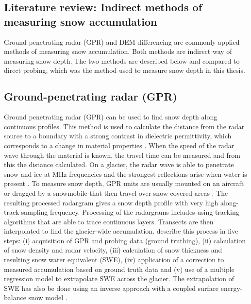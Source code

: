 \documentclass{sfuthesis}
\begin{document}
{\begin{appendices}
\chapter{Literature review: Indirect methods of measuring snow accumulation }
\label{app:snow_measure_methods}

Ground-penetrating radar (GPR) and DEM differencing are commonly applied methods of measuring snow accumulation. Both methods are indirect way of measuring snow depth. The two methods are described below and compared to direct probing, which was the method used to measure snow depth in this thesis. 

\section{Ground-penetrating radar (GPR)}

Ground penetrating radar (GPR) can be used to find snow depth along continuous profiles. This method is used to calculate the distance from the radar source to a boundary with a strong contrast in dielectric permittivity, which corresponds to a change in material properties \citep{Sold2013}. When the speed of the radar wave through the material is known, the travel time can be measured and from this the distance calculated. On a glacier, the radar wave is able to penetrate snow and ice at MHz frequencies and the strongest reflections arise when water is present \citep{Sold2013}. To measure snow depth, GPR units are usually mounted on an aircraft or dragged by a snowmobile that then travel over snow covered areas \citep{Machguth2006, McGrath2015}. The resulting processed radargram gives a snow depth profile with very high along-track sampling frequency. Processing of the radargrams includes using tracking algorithms that are able to trace continuous layers. Transects are then interpolated to find the glacier-wide accumulation. \cite{McGrath2015} describe this process in five steps: (i) acquisition of GPR and probing data (ground truthing), (ii) calculation of snow density and radar velocity, (iii) calculation of snow thickness and resulting snow water equivalent (SWE), (iv) application of a correction to measured accumulation based on ground truth data and (v) use of a multiple regression model to extrapolate SWE across the glacier. The extrapolation of SWE has also be done using an inverse approach with a coupled surface energy-balance snow model \citep{Pelt2014}.


\end{appendices}}
\end{document}
